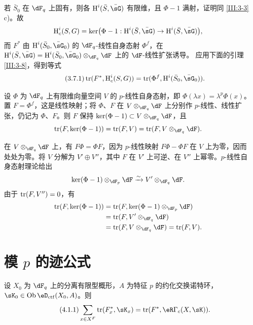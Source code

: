 \subsection{}\label{III:3-7}
若 $\bar S_0$ 在 $\dF_q$ 上固有，则各 $\h^i(\bar S,\bar\sG)$ 有限维，且 $\Phi-1$ 满射，证明同 \ref{III:3-3} c)。故
\[\h_c^i(S,G)=\ker\bigl(\Phi-1:\h^i(\bar S,\bar\sG)\to\h^i(\bar S,\bar\sG)\bigr),\]
而 $F^*$ 由 $\h^i(\bar S_0,\bar\sG_0)$ 的 $\dF_q$-线性自身态射 $\Phi^f$，在 $\h^i(\bar S,\bar\sG)=\h^i(\bar S_0,\bar\sG_0)\otimes_{\dF_q}\dF$ 上的 $\dF$-线性扩张诱导。
应用下面的引理 \ref{III:3-8}，得到等式
\begin{equation*}\tag{3.7.1}\label{III:eq:3-7-1}
\tr(F^*,\h_c^i(S,G))=\tr(\Phi^f,\h^i(\bar S_0,\bar\sG_0)).
\end{equation*}

\begin{lemma_}\label{III:3-8}
设 $\Phi$ 为 $\dF_q$ 上有限维向量空间 $V$ 的 $p$-线性自身态射，即 $\Phi(\lambda x)=\lambda^p\Phi(x)$。置 $F=\Phi^f$，这是线性映射；将 $\Phi$、$F$ 在 $V\otimes_{\dF_q}\dF$ 上分别作 $p$-线性、线性扩张，仍记为 $\Phi$、$F$。则 $F$ 保持 $\ker(\Phi-1)\subset V\otimes_{\dF_q}\dF$，且
\[\tr(F,\ker(\Phi-1))=\tr(F,V)=\tr(F,V\otimes_{\dF_q}\dF).\]
\end{lemma_}
在 $V\otimes_{\dF_q}\dF$ 上，有 $F\Phi=\Phi F$，因为 $p$-线性映射 $F\Phi-\Phi F$ 在 $V$ 上为零，因而处处为零。将 $V$ 分解为 $V'\oplus V''$，其中 $F$ 在 $V'$ 上可逆、在 $V''$ 上幂零。$p$-线性自身态射理论给出
\[\ker(\Phi-1)\otimes_{\dF_p}\dF\iso V'\otimes_{\dF_q}\dF.\]
由于 $\operatorname{tr}(F,V'')=0$，有
\begin{align*}
\tr(F,\ker(\Phi-1))&=\tr(F,\ker(\Phi-1)\otimes_{\dF_p}\dF)\\
&=\tr(F,V'\otimes_{\dF_q}\dF)\\
&=\tr(F,V\otimes_{\dF_q}\dF)=\tr(F,V).
\end{align*}

\section{模 \texorpdfstring{$p$}{p} 的迹公式}\label{III:4}
\begin{theorem_}\label{III:4-1}
设 $X_0$ 为 $\dF_q$ 上的分离有限型概形，$A$ 为特征 $p$ 的约化交换诺特环，$\sK_0\in\ob\eD_{\mathrm{ctf}}(X_0,A)$。则
\begin{equation*}\tag{4.1.1}\label{III:eq:4-1-1}
\sum_{x\in X^F}\tr(F_x^*,\sK_x)=\tr(F^*,\eR\Gamma_c(X,\sK)).
\end{equation*}
\end{theorem_}

